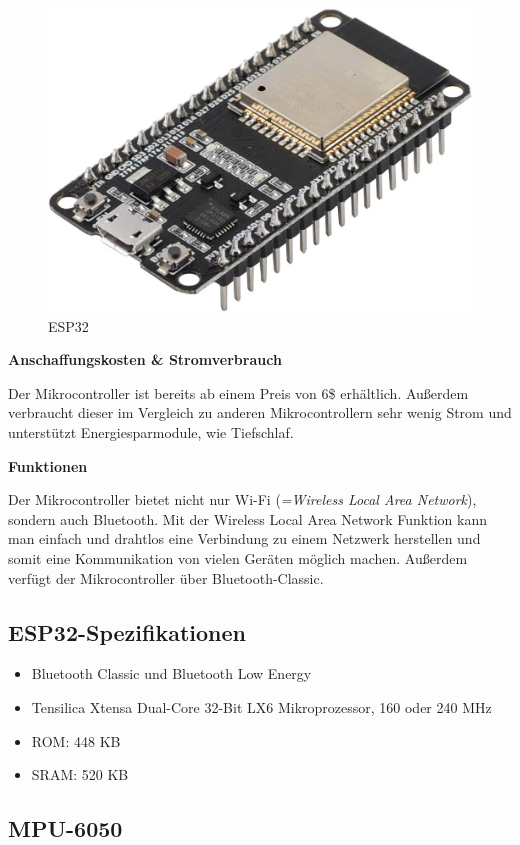 \begin{figure}[H]
	\centering
	\includegraphics[width=0.7\linewidth]{images/ESP32.jpg}
	\caption[ESP32]{ESP32}
	\label{fig:ESP32}
\end{figure}

\textbf{Anschaffungskosten \& Stromverbrauch}

Der Mikrocontroller ist bereits ab einem Preis von 6\$ erhältlich. Außerdem verbraucht dieser im Vergleich zu anderen Mikrocontrollern sehr wenig Strom und unterstützt Energiesparmodule, wie Tiefschlaf.

\textbf{Funktionen}

Der Mikrocontroller bietet nicht nur Wi-Fi (\textit{=Wireless Local Area Network}), sondern auch Bluetooth. Mit der Wireless Local Area Network Funktion kann man einfach und drahtlos eine Verbindung zu einem Netzwerk herstellen und somit eine Kommunikation von vielen Geräten möglich machen. Außerdem verfügt der Mikrocontroller über Bluetooth-Classic.

\subsection{ESP32-Spezifikationen}

\begin{itemize}
	\item Bluetooth Classic und Bluetooth Low Energy
	\item Tensilica Xtensa Dual-Core 32-Bit LX6 Mikroprozessor, 160 oder 240 MHz
	\item ROM:  448 KB
	\item SRAM:  520 KB 
\end{itemize}

\subsection{MPU-6050}


